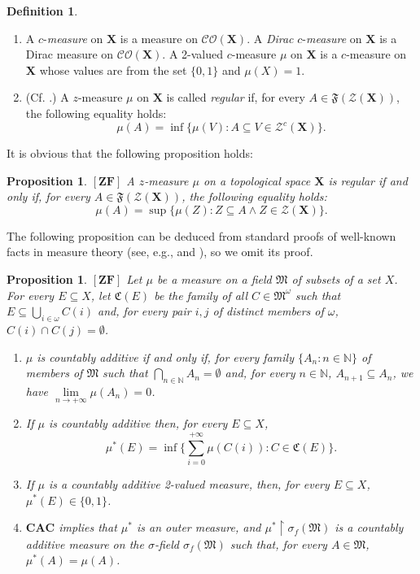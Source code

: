 \documentclass[12pt,twoside,leqno]{article}
\theoremstyle{plain}
\newtheorem{proposition}[theorem]{Proposition}
\theoremstyle{definition}
\newtheorem{definition}[theorem]{Definition}
\theoremstyle{remark}
\begin{document}
\begin{definition}
\begin{enumerate}
\begin{enumerate}
			\item[(vii)] A $c$-\emph{measure} on $\mathbf{X}$ is a measure on $\mathcal{CO}(\mathbf{X})$. A \emph{Dirac} $c$-\emph{measure} on $\mathbf{X}$ is a Dirac measure on $\mathcal{CO}(\mathbf{X})$. A 2-valued $c$-measure $\mu$ on $\mathbf{X}$ is a $c$-measure on $\mathbf{X}$ whose values are from the set $\{0, 1\}$ and $\mu(X)=1$. 
			\item[(viii)] (Cf. \cite[p. 483]{nag}.) A $z$-measure $\mu$ on $\mathbf{X}$ is called \emph{regular} if, for every $A\in \mathfrak{F}(\mathcal{Z}(\mathbf{X}))$, the following equality holds:
			$$\mu(A)=\inf\{\mu(V): A\subseteq V\in\mathcal{Z}^c(\mathbf{X})\}.$$
		\end{enumerate} 
	\end{enumerate}
\end{definition}

It is obvious that the following proposition holds:

\begin{proposition}
	\label{s8:p3}
	$[\mathbf{ZF}]$ A $z$-measure $\mu$ on a topological space $\mathbf{X}$ is regular if and only if, for every $A\in \mathfrak{F}(\mathcal{Z}(\mathbf{X}))$, the following equality holds:
	$$\mu(A)=\sup\{\mu(Z): Z\subseteq A\wedge Z\in \mathcal{Z}(\mathbf{X})\}.$$
\end{proposition}

The following proposition can be deduced from standard proofs of well-known facts in measure theory (see, e.g., \cite[pp. 54--57]{hal} and \cite{yh}), so we omit its proof.

\begin{proposition}
	\label{s8:p4}
	$[\mathbf{ZF}]$ Let $\mu$ be a measure on a field $\mathfrak{M}$ of subsets of a set $X$. For every $E\subseteq X$, let $\mathfrak{C}(E)$ be the family of all $C\in\mathfrak{M}^{\omega}$ such that $E\subseteq\bigcup\limits_{i\in\omega}C(i)$ and, for every pair $i,j$ of distinct members of $\omega$, $C(i)\cap C(j)=\emptyset$.
	\begin{enumerate}
		\item[(i)] $\mu$ is countably additive if and only if, for every family $\{A_n: n\in\mathbb{N}\}$ of members of $\mathfrak{M}$ such that $\bigcap\limits_{n\in\mathbb{N}}A_n=\emptyset$ and, for every $n\in\mathbb{N}$, $A_{n+1}\subseteq A_n$, we have $\lim\limits_{n\to+\infty}\mu(A_n)=0$.
		\item[(ii)] If $\mu$ is countably additive then, for every $E\subseteq X$, 
		$$\mu^{\ast}(E)=\inf\{\sum\limits_{i=0}^{+\infty}\mu(C(i)): C\in\mathfrak{C}(E)\}.$$
		\item[(iii)] If $\mu$ is a countably additive  2-valued measure, then, for every $E\subseteq X$, $\mu^{\ast}(E)\in\{0, 1\}$.
		\item[(iv)] $\mathbf{CAC}$ implies that $\mu^{\ast}$ is an outer measure, and $\mu^{\ast}\upharpoonright \sigma_f(\mathfrak{M})$ is a countably additive measure on the $\sigma$-field $\sigma_f(\mathfrak{M})$ such that, for every $A\in\mathfrak{M}$, $\mu^{\ast}(A)=\mu(A)$.
	\end{enumerate}
\end{proposition}
\end{document}
